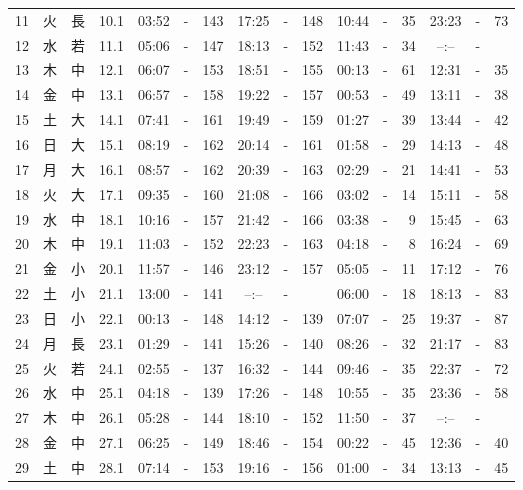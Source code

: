 \documentclass[12pt.a4j]{jsarticle}
\begin{document}
\begin{center}
\begin{table}[ht]
\begin{tabular}{|rc|cr|ccrccr|ccrccr|}
11 & 火 & 長 & 10.1 &  03:52 &-& 143  &  17:25 &-& 148  &   10:44 &-&  35  &   23:23 &-&  73  \\
12 & 水 & 若 & 11.1 &  05:06 &-& 147  &  18:13 &-& 152  &   11:43 &-&  34  &   --:-- &-&     \\
13 & 木 & 中 & 12.1 &  06:07 &-& 153  &  18:51 &-& 155  &   00:13 &-&  61  &   12:31 &-&  35  \\
14 & 金 & 中 & 13.1 &  06:57 &-& 158  &  19:22 &-& 157  &   00:53 &-&  49  &   13:11 &-&  38  \\
15 & 土 & 大 & 14.1 &  07:41 &-& 161  &  19:49 &-& 159  &   01:27 &-&  39  &   13:44 &-&  42  \\
16 & 日 & 大 & 15.1 &  08:19 &-& 162  &  20:14 &-& 161  &   01:58 &-&  29  &   14:13 &-&  48  \\
17 & 月 & 大 & 16.1 &  08:57 &-& 162  &  20:39 &-& 163  &   02:29 &-&  21  &   14:41 &-&  53  \\
18 & 火 & 大 & 17.1 &  09:35 &-& 160  &  21:08 &-& 166  &   03:02 &-&  14  &   15:11 &-&  58  \\
19 & 水 & 中 & 18.1 &  10:16 &-& 157  &  21:42 &-& 166  &   03:38 &-&   9  &   15:45 &-&  63  \\
20 & 木 & 中 & 19.1 &  11:03 &-& 152  &  22:23 &-& 163  &   04:18 &-&   8  &   16:24 &-&  69  \\
21 & 金 & 小 & 20.1 &  11:57 &-& 146  &  23:12 &-& 157  &   05:05 &-&  11  &   17:12 &-&  76  \\
22 & 土 & 小 & 21.1 &  13:00 &-& 141  &  --:-- &-&     &   06:00 &-&  18  &   18:13 &-&  83  \\
23 & 日 & 小 & 22.1 &  00:13 &-& 148  &  14:12 &-& 139  &   07:07 &-&  25  &   19:37 &-&  87  \\
24 & 月 & 長 & 23.1 &  01:29 &-& 141  &  15:26 &-& 140  &   08:26 &-&  32  &   21:17 &-&  83  \\
25 & 火 & 若 & 24.1 &  02:55 &-& 137  &  16:32 &-& 144  &   09:46 &-&  35  &   22:37 &-&  72  \\
26 & 水 & 中 & 25.1 &  04:18 &-& 139  &  17:26 &-& 148  &   10:55 &-&  35  &   23:36 &-&  58  \\
27 & 木 & 中 & 26.1 &  05:28 &-& 144  &  18:10 &-& 152  &   11:50 &-&  37  &   --:-- &-&     \\
28 & 金 & 中 & 27.1 &  06:25 &-& 149  &  18:46 &-& 154  &   00:22 &-&  45  &   12:36 &-&  40  \\
29 & 土 & 中 & 28.1 &  07:14 &-& 153  &  19:16 &-& 156  &   01:00 &-&  34  &   13:13 &-&  45  \\

\end{tabular}
\end{table}
\end{center}
\end{document}
